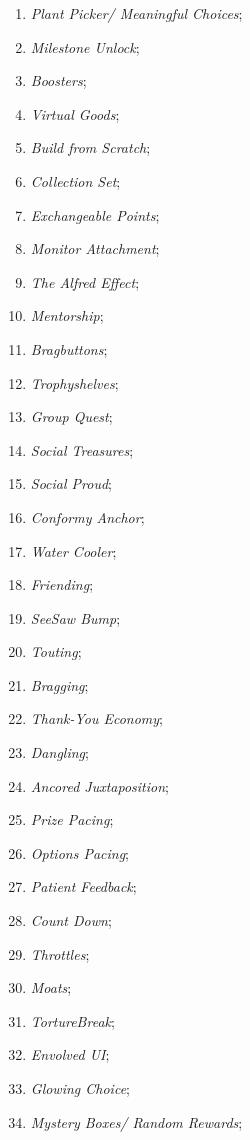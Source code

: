 \begin{multicols}{2}
\begin{enumerate}
        \item \textit{Plant Picker/ Meaningful Choices};
        \item \textit{Milestone Unlock};
        \item \textit{Boosters};
        \item \textit{Virtual Goods};
        \item \textit{Build from Scratch};
        \item \textit{Collection Set};
        \item \textit{Exchangeable Points};
        \item \textit{Monitor Attachment};
        \item \textit{The Alfred Effect};
        \item \textit{Mentorship};
        \item \textit{Bragbuttons};
        \item \textit{Trophyshelves};
        \item \textit{Group Quest};
        \item \textit{Social Treasures};
        \item \textit{Social Proud};
        \item \textit{Conformy Anchor};
        \item \textit{Water Cooler};
        \item \textit{Friending};
        \item \textit{SeeSaw Bump};
        \item \textit{Touting};
        \item \textit{Bragging};
        \item \textit{Thank-You Economy};
        \item \textit{Dangling};
        \item \textit{Ancored Juxtaposition};
        \item \textit{Prize Pacing};
        \item \textit{Options Pacing};
        \item \textit{Patient Feedback};
        \item \textit{Count Down};
        \item \textit{Throttles};
        \item \textit{Moats};
        \item \textit{TortureBreak};
        \item \textit{Envolved UI};
        \item \textit{Glowing Choice};
        \item \textit{Mystery Boxes/ Random Rewards};

\end{enumerate}
\end{multicols}
